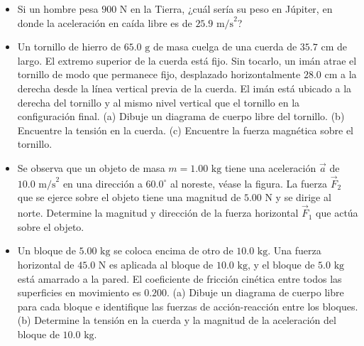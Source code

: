 \documentclass[11pt,a4paper]{article}
\begin{document}
\begin{itemize}
    \item[\textbf{17.}] Si un hombre pesa $900 \text{ N}$ en la Tierra, ¿cuál sería su peso en Júpiter, en donde la aceleración en caída libre es de $25.9 \text{ m/s}^2$?
    \vspace*{5cm}

    \item[\textbf{18.}] Un tornillo de hierro de $65.0 \text{ g}$ de masa cuelga de una cuerda de $35.7 \text{ cm}$ de largo. El extremo superior de la cuerda está fijo. Sin tocarlo, un imán atrae el tornillo de modo que permanece fijo, desplazado horizontalmente $28.0 \text{ cm}$ a la derecha desde la línea vertical previa de la cuerda. El imán está ubicado a la derecha del tornillo y al mismo nivel vertical que el tornillo en la configuración final. (a) Dibuje un diagrama de cuerpo libre del tornillo. (b) Encuentre la tensión en la cuerda. (c) Encuentre la fuerza magnética sobre el tornillo.
    \vspace*{7cm}

    \item[\textbf{19.}] Se observa que un objeto de masa $m = 1.00 \text{ kg}$ tiene una aceleración $\vec{a}$ de $10.0 \text{ m/s}^2$ en una dirección a $60.0^\circ$ al noreste, véase la figura. La fuerza $\vec{F}_2$ que se ejerce sobre el objeto tiene una magnitud de $5.00 \text{ N}$ y se dirige al norte. Determine la magnitud y dirección de la fuerza horizontal $\vec{F}_1$ que actúa sobre el objeto.
    \vspace*{6cm}

    \item[\textbf{20.}] Un bloque de $5.00 \text{ kg}$ se coloca encima de otro de $10.0 \text{ kg}$. Una fuerza horizontal de $45.0 \text{ N}$ es aplicada al bloque de $10.0 \text{ kg}$, y el bloque de $5.0 \text{ kg}$ está amarrado a la pared. El coeficiente de fricción cinética entre todos las superficies en movimiento es $0.200$. (a) Dibuje un diagrama de cuerpo libre para cada bloque e identifique las fuerzas de acción-reacción entre los bloques. (b) Determine la tensión en la cuerda y la magnitud de la aceleración del bloque de $10.0 \text{ kg}$.
    \vspace*{7cm}
\end{itemize}

\newpage
\end{document}
